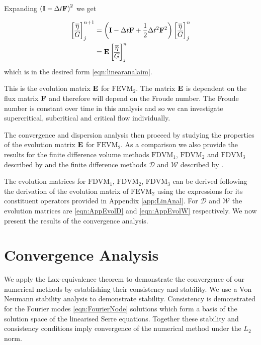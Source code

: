 Expanding $\left(\mathbf{I} - \Delta t\mathbf{F} \right)^2$ we get

\begin{align}
\begin{bmatrix}
\overline{\eta} \\ \overline{G}
\end{bmatrix}^{n+1}_j &= \left(\mathbf{I}  -\Delta t\mathbf{F} + \frac{1}{2}\Delta t^2\mathbf{F}^2 \right) \begin{bmatrix}
\overline{\eta} \\ \overline{G}
\end{bmatrix}^{n}_j \nonumber\\ &=  \mathbf{E}\begin{bmatrix}
\overline{\eta} \\ \overline{G}
\end{bmatrix}^{n}_j
\label{eqn:evolutionmatrix}
\end{align}
which is in the desired form \eqref{eqn:linearanalaim}.

This is the evolution matrix $\mathbf{E}$ for $\text{FEVM}_2$. The matrix $\mathbf{E}$ is dependent on the flux matrix $\mathbf{F}$ and therefore will depend on the Froude number. The Froude number is constant over time in this analysis and so we can investigate supercritical, subcritical and critical flow individually.

The convergence and dispersion analysis then proceed by studying the properties of the evolution matrix $\mathbf{E}$ for $\text{FEVM}_2$. As a comparison we also provide the results for the finite difference volume methods $\text{FDVM}_1$, $\text{FDVM}_2$ and $\text{FDVM}_3$ described by \citet{Zoppou-etal-2017} and the finite difference methods $\mathcal{D}$ and $\mathcal{W}$ described by \citet{Pitt-2018-61}.

The evolution matrices for $\text{FDVM}_1$, $\text{FDVM}_2$, $\text{FDVM}_3$ can be derived following the derivation of the evolution matrix of $\text{FEVM}_2$ using the expressions for its constituent operators provided in Appendix \ref{app:LinAnal}. For $\mathcal{D}$ and $\mathcal{W}$ the evolution matrices are \eqref{eqn:AppEvolD} and \eqref{eqn:AppEvolW} respectively. We now present the results of the convergence analysis.

\section{Convergence Analysis}
We apply the Lax-equivalence theorem to demonstrate the convergence of our numerical methods by establishing their consistency and stability. We use a Von Neumann stability analysis to demonstrate stability. Consistency is demonstrated for the Fourier modes \eqref{eqn:FourierNode} solutions which form a basis of the solution space of the linearised Serre equations. Together these stability and consistency conditions imply convergence of the numerical method under the $L_2$ norm. 


